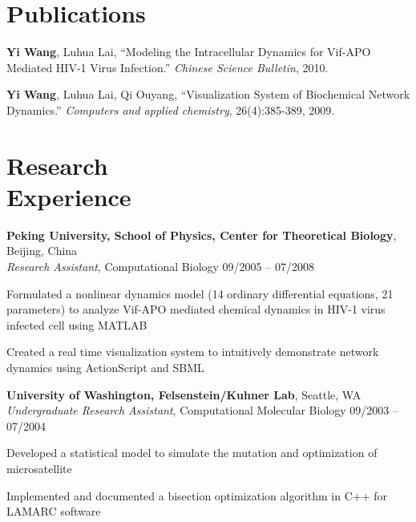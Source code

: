 \documentclass[margin,line]{resume}
\begin{document}
\begin{resume}
    \section{\mysidestyle Publications}

      \textbf{Yi Wang}, Luhua Lai, ``Modeling the Intracellular Dynamics for Vif-APO Mediated HIV-1 Virus Infection.''
      \textsl{Chinese Science Bulletin}, 2010.

      \textbf{Yi Wang}, Luhua Lai, Qi Ouyang, ``Visualization System of Biochemical Network Dynamics.''
      \textsl{Computers and applied chemistry}, 26(4):385-389, 2009.

    \section{\mysidestyle Research \\ Experience}

    \textbf{Peking University, School of Physics, Center for Theoretical Biology}, Beijing, China \\
    \textsl{Research Assistant}, Computational Biology \hfill 09/2005 -- 07/2008 \vspace{-3mm}\\\vspace{-1mm}%
      \begin{list2}
      \item Formulated a nonlinear dynamics model (14 ordinary differential equations, 21 parameters) to analyze Vif-APO mediated chemical dynamics in HIV-1 virus infected cell using MATLAB
      \item Created a real time visualization system to intuitively demonstrate network dynamics using ActionScript and SBML 
      \end{list2}

    \textbf{University of Washington, Felsenstein/Kuhner Lab}, Seattle, WA \\
    \textsl{Undergraduate Research Assistant}, Computational Molecular Biology \hfill 09/2003 -- 07/2004  \vspace{-3mm}\\\vspace{-1mm}%
      \begin{list2}
      \item Developed a statistical model to simulate the mutation and optimization of microsatellite 
      \item Implemented and documented a bisection optimization algorithm in C++ for LAMARC software 
      \end{list2}
      

\end{resume}
\end{document}
